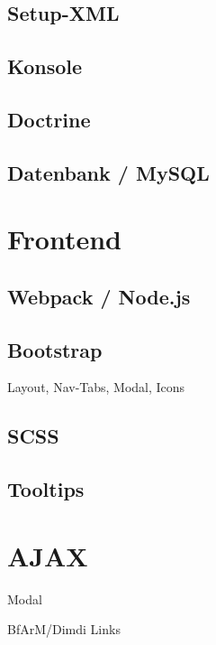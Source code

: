 \subsection{Setup-XML}

\subsection{Konsole}

\subsection{Doctrine}

\subsection{Datenbank / MySQL}

\section{Frontend}

\subsection{Webpack / Node.js}

\subsection{Bootstrap}

Layout, Nav-Tabs, Modal, Icons

\subsection{SCSS}

\subsection{Tooltips}

\section{AJAX}

Modal

BfArM/Dimdi Links

\section{}

